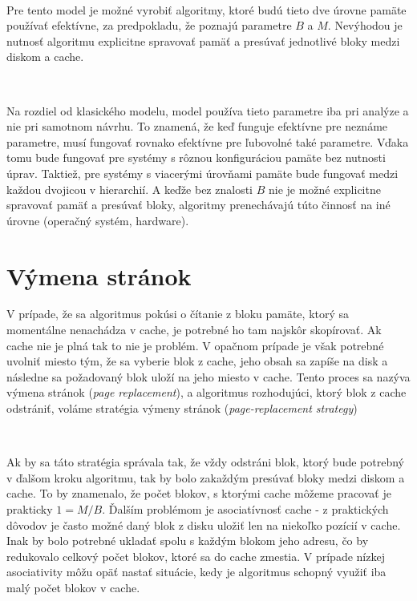 \

Pre tento model je možné vyrobiť algoritmy, ktoré budú tieto dve úrovne pamäte používať efektívne, za predpokladu, že poznajú parametre $B$ a $M$. Nevýhodou je nutnosť algoritmu explicitne spravovať pamäť a presúvať jednotlivé bloky medzi diskom a cache.

\

Na rozdiel od klasického modelu, \obliv model používa tieto parametre iba pri analýze a nie pri samotnom návrhu. To znamená, že keď funguje efektívne pre neznáme parametre, musí fungovať rovnako efektívne pre ľubovolné také parametre. Vďaka tomu bude fungovať pre systémy s rôznou konfiguráciou pamäte bez nutnosti úprav. Taktiež, pre systémy s viacerými úrovňami pamäte bude fungovať medzi každou dvojicou v hierarchií. A keďže bez znalosti $B$ nie je možné explicitne spravovať pamäť a presúvať bloky, \obliv algoritmy prenechávajú túto činnosť na iné úrovne (operačný systém, hardware).

\section{Výmena stránok}

V prípade, že sa \obliv algoritmus pokúsi o čítanie z bloku pamäte, ktorý sa momentálne nenachádza v cache, je potrebné ho tam najskôr skopírovať. Ak cache nie je plná tak to nie je problém. V opačnom prípade je však potrebné uvolniť miesto tým, že sa vyberie blok z cache, jeho obsah sa zapíše na disk a následne sa požadovaný blok uloží na jeho miesto v cache. Tento proces sa nazýva výmena stránok ({\em page replacement}), a algoritmus rozhodujúci, ktorý blok z cache odstrániť, voláme stratégia výmeny stránok ({\em page-replacement strategy})

\

Ak by sa táto stratégia správala tak, že vždy odstráni blok, ktorý bude potrebný v ďalšom kroku algoritmu, tak by bolo zakaždým presúvať bloky medzi diskom a cache. To by znamenalo, že počet blokov, s ktorými cache môžeme pracovať je prakticky $1 = M/B$. Ďalším problémom je asociatívnosť cache - z praktických dôvodov je často možné daný blok z disku uložiť len na niekoľko pozícií v cache. Inak by bolo potrebné ukladať spolu s každým blokom jeho adresu, čo by redukovalo celkový počet blokov, ktoré sa do cache zmestia. V prípade nízkej asociativity môžu opäť nastať situácie, kedy je algoritmus schopný využiť iba malý počet blokov v cache.

\

